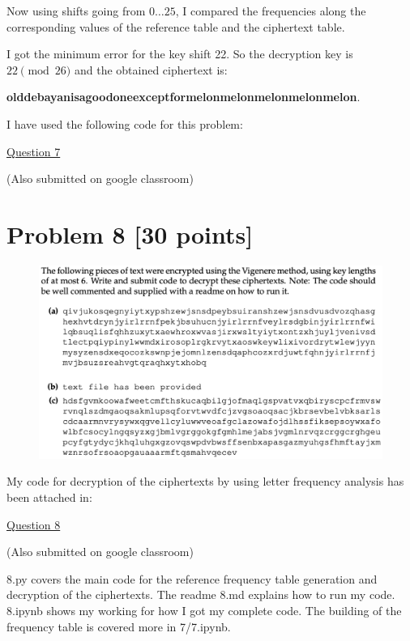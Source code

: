 \documentclass{ashoka-crypto}
\begin{document}
\begin{enumerate}[label=(\alph*)]
Now using shifts going from $0\dots 25$, I compared the frequencies along the corresponding values of the reference table and the ciphertext table.

I got the minimum error for the key shift 22. So the decryption key is $22 \pmod {26}$ and the obtained ciphertext is:

\textbf{olddebayanisagoodoneexceptformelonmelonmelonmelonmelon}.

I have used the following code for this problem:

\href{https://drive.google.com/drive/folders/1gOnXQfiFdAFC98va1a8lqxHWZiv2zwLx?usp=sharing}{Question 7}

(Also submitted on google classroom)

\end{enumerate}

\clearpage 

\section*{Problem 8 [30 points]}

\begin{figure}[h]
\includegraphics[width=17cm]{8}
\end{figure}

My code for decryption of the ciphertexts by using letter frequency analysis has been attached in:

\href{https://drive.google.com/drive/folders/1Pc5Ld6Vsz-CbPtESxMlKouj5Vsph8fID?usp=sharing}{Question 8}

(Also submitted on google classroom)

8.py covers the main code for the reference frequency table generation and decryption of the ciphertexts. The readme 8.md explains how to run my code. 8.ipynb shows my working for how I got my complete code. The building of the frequency table is covered more in 7/7.ipynb.
\end{document}
